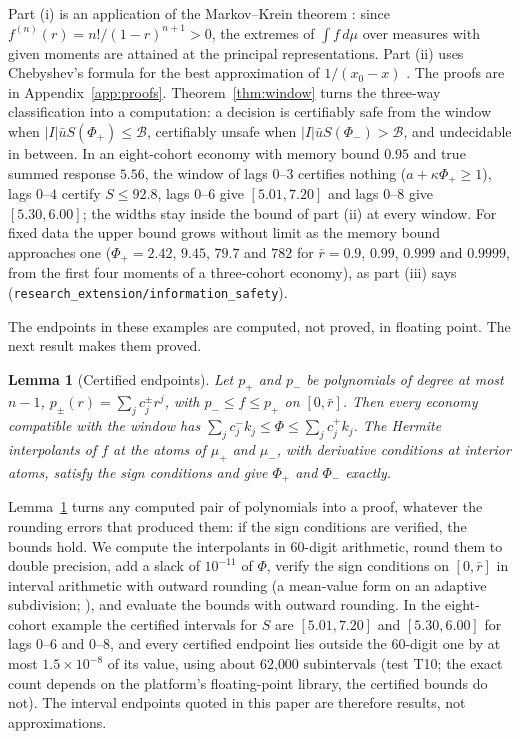 \documentclass[12pt]{article}
\newtheorem{lemma}[theorem]{Lemma}
\theoremstyle{definition}
\theoremstyle{remark}
\begin{document}
Part (i) is an application of the Markov--Krein theorem \citep{krein1977,karlin1966}: since $f^{(n)}(r)=n!/(1-r)^{n+1}>0$, the extremes of $\int f\,d\mu$ over measures with given moments are attained at the principal representations. Part (ii) uses Chebyshev's formula for the best approximation of $1/(x_0-x)$ \citep{achieser1956}. The proofs are in Appendix~\ref{app:proofs}. Theorem~\ref{thm:window} turns the three-way classification into a computation: a decision is certifiably safe from the window when $|I|\bar uS(\Phi_+)\le\mathcal B$, certifiably unsafe when $|I|\bar uS(\Phi_-)>\mathcal B$, and undecidable in between. In an eight-cohort economy with memory bound $0.95$ and true summed response $5.56$, the window of lags $0$--$3$ certifies nothing ($a+\kappa\Phi_+\ge1$), lags $0$--$4$ certify $S\le92.8$, lags $0$--$6$ give $[5.01,7.20]$ and lags $0$--$8$ give $[5.30,6.00]$; the widths stay inside the bound of part (ii) at every window. For fixed data the upper bound grows without limit as the memory bound approaches one ($\Phi_+=2.42$, $9.45$, $79.7$ and $782$ for $\bar r=0.9$, $0.99$, $0.999$ and $0.9999$, from the first four moments of a three-cohort economy), as part (iii) says (\texttt{research\_extension/information\_safety}).

The endpoints in these examples are computed, not proved, in floating point. The next result makes them proved.

\begin{lemma}[Certified endpoints]\label{lem:certnum}
Let $p_+$ and $p_-$ be polynomials of degree at most $n-1$, $p_\pm(r)=\sum_jc^\pm_jr^j$, with $p_-\le f\le p_+$ on $[0,\bar r]$. Then every economy compatible with the window has $\sum_jc^-_jk_j\le\Phi\le\sum_jc^+_jk_j$. The Hermite interpolants of $f$ at the atoms of $\mu_+$ and $\mu_-$, with derivative conditions at interior atoms, satisfy the sign conditions and give $\Phi_+$ and $\Phi_-$ exactly.
\end{lemma}

Lemma~\ref{lem:certnum} turns any computed pair of polynomials into a proof, whatever the rounding errors that produced them: if the sign conditions are verified, the bounds hold. We compute the interpolants in 60-digit arithmetic, round them to double precision, add a slack of $10^{-11}$ of $\Phi$, verify the sign conditions on $[0,\bar r]$ in interval arithmetic with outward rounding (a mean-value form on an adaptive subdivision; \citealp{rump2010}), and evaluate the bounds with outward rounding. In the eight-cohort example the certified intervals for $S$ are $[5.01,7.20]$ and $[5.30,6.00]$ for lags $0$--$6$ and $0$--$8$, and every certified endpoint lies outside the 60-digit one by at most $1.5\times10^{-8}$ of its value, using about 62{,}000 subintervals (test T10; the exact count depends on the platform's floating-point library, the certified bounds do not). The interval endpoints quoted in this paper are therefore results, not approximations.
\end{document}
